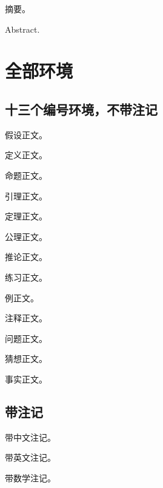 \documentclass[fontset=fandol,stage=final,degree-level=master,campus=harbin]{hithesis}
\begin{document}
\begin{cabstract}摘要。\end{cabstract}
\begin{eabstract}Abstract.\end{eabstract}
\makecover
\tableofcontents
\mainmatter
\chapter{全部环境}

\section{十三个编号环境，不带注记}
\begin{assumption}\label{thm:as}假设正文。\end{assumption}
\begin{definition}定义正文。\end{definition}
\begin{proposition}命题正文。\end{proposition}
\begin{lemma}引理正文。\end{lemma}
\begin{theorem}定理正文。\end{theorem}
\begin{axiom}公理正文。\end{axiom}
\begin{corollary}推论正文。\end{corollary}
\begin{exercise}练习正文。\end{exercise}
\begin{example}例正文。\end{example}
\begin{remark}注释正文。\end{remark}
\begin{problem}问题正文。\end{problem}
\begin{conjecture}猜想正文。\end{conjecture}
\begin{fact}事实正文。\end{fact}

\section{带注记}
\begin{theorem}[（霍金）]带中文注记。\end{theorem}
\begin{definition}[Hawking]带英文注记。\end{definition}
\begin{lemma}[$\alpha>0$]带数学注记。\end{lemma}
\end{document}
